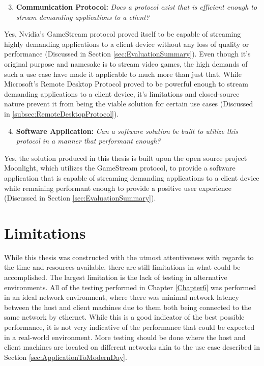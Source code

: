 \begin{enumerate}
  \setcounter{enumi}{2} %
  \item \textbf{Communication Protocol:} \emph{Does a protocol exist that is efficient enough to stream demanding applications to a client?}
\end{enumerate}

\noindent
Yes, Nvidia's GameStream protocol proved itself to be capable of streaming highly demanding applications to a client device without any loss of quality or performance (Discussed in Section \ref{sec:EvaluationSummary}).
Even though it's original purpose and namesake is to stream video games, the high demands of such a use case have made it applicable to much more than just that.
While Microsoft's Remote Desktop Protocol proved to be powerful enough to stream demanding applications to a client device, it's limitations and closed-source nature prevent it from being the viable solution for certain use cases (Discussed in \ref{subsec:RemoteDesktopProtocol}).

\begin{enumerate}
  \setcounter{enumi}{3} %
  \item \textbf{Software Application:} \emph{Can a software solution be built to utilize this protocol in a manner that performant enough?}
\end{enumerate}

\noindent
Yes, the solution produced in this thesis is built upon the open source project Moonlight, which utilizes the GameStream protocol, to provide a software application that is capable of streaming demanding applications to a client device while remaining performant enough to provide a positive user experience (Discussed in Section \ref{sec:EvaluationSummary}).


\section{Limitations}\label{sec:ConclusionLimitations}

While this thesis was constructed with the utmost attentiveness with regards to the time and resources available, there are still limitations in what could be accomplished.
The largest limitation is the lack of testing in alternative environments.
All of the testing performed in Chapter \ref{Chapter6} was performed in an ideal network environment, where there was minimal network latency between the host and client machines due to them both being connected to the same network by ethernet.
While this is a good indicator of the best possible performance, it is not very indicative of the performance that could be expected in a real-world environment.
More testing should be done where the host and client machines are located on different networks akin to the use case described in Section \ref{sec:ApplicationToModernDay}.

